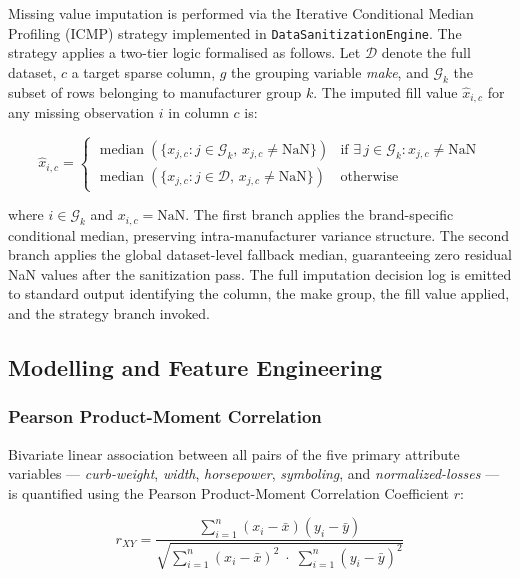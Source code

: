 \documentclass[conference]{IEEEtran}
\begin{document}
Missing value imputation is performed via the Iterative Conditional
Median Profiling (ICMP) strategy implemented in \texttt{DataSanitizationEngine}.
The strategy applies a two-tier logic formalised as follows. Let
$\mathcal{D}$ denote the full dataset, $c$ a target sparse column,
$g$ the grouping variable \textit{make}, and $\mathcal{G}_k$ the subset
of rows belonging to manufacturer group $k$. The imputed fill value
$\hat{x}_{i,c}$ for any missing observation $i$ in column $c$ is:

\begin{equation}
\hat{x}_{i,c} =
\begin{cases}
\operatorname{median}\!\left(\{x_{j,c} : j \in \mathcal{G}_k,\,
  x_{j,c} \neq \mathrm{NaN}\}\right)
  & \text{if } \exists\, j \in \mathcal{G}_k : x_{j,c} \neq \mathrm{NaN} \\[6pt]
\operatorname{median}\!\left(\{x_{j,c} : j \in \mathcal{D},\,
  x_{j,c} \neq \mathrm{NaN}\}\right)
  & \text{otherwise}
\end{cases}
\label{eq:icmp}
\end{equation}

\noindent where $i \in \mathcal{G}_k$ and $x_{i,c} = \mathrm{NaN}$.
The first branch applies the brand-specific conditional median,
preserving intra-manufacturer variance structure. The second branch
applies the global dataset-level fallback median, guaranteeing zero
residual NaN values after the sanitization pass. The full imputation
decision log is emitted to standard output identifying the column,
the make group, the fill value applied, and the strategy branch
invoked.

\subsection{Modelling and Feature Engineering}

\subsubsection{Pearson Product-Moment Correlation}

Bivariate linear association between all pairs of the five primary
attribute variables — \textit{curb-weight}, \textit{width},
\textit{horsepower}, \textit{symboling}, and
\textit{normalized-losses} — is quantified using the Pearson
Product-Moment Correlation Coefficient $r$:

\begin{equation}
r_{XY} = \frac{\displaystyle\sum_{i=1}^{n}
  \left(x_i - \bar{x}\right)\!\left(y_i - \bar{y}\right)}
{\sqrt{\displaystyle\sum_{i=1}^{n}\left(x_i - \bar{x}\right)^2\;
\cdot\;\sum_{i=1}^{n}\left(y_i - \bar{y}\right)^2}}
\label{eq:pearson}
\end{equation}
\end{document}
